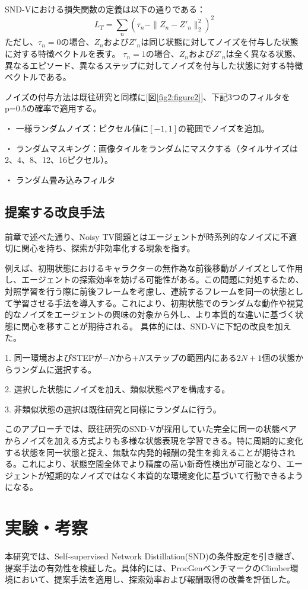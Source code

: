 SND-Vにおける損失関数の定義は以下の通りである：
\[
 L_T = \sum_{n} (\tau_n - \| Z_n - Z'_n \|_2^2)^2
\]
ただし、\(\tau_n = 0\)の場合、\(Z_n\)および\(Z'_n\)は同じ状態に対してノイズを付与した状態に対する特徴ベクトルを表す。
\(\tau_n = 1\)の場合、\(Z_n\)および\(Z'_n\)は全く異なる状態、異なるエピソード、異なるステップに対してノイズを付与した状態に対する特徴ベクトルである。

ノイズの付与方法は既往研究と同様に[図\ref{fig2:figure2}]、下記3つのフィルタをp=0.5の確率で適用する。

・ 一様ランダムノイズ：ピクセル値に\([-1, 1]\)の範囲でノイズを追加。

・ ランダムマスキング：画像タイルをランダムにマスクする（タイルサイズは2、4、8、12、16ピクセル）。

・ ランダム畳み込みフィルタ

\subsection{提案する改良手法}

前章で述べた通り、Noisy TV問題とはエージェントが時系列的なノイズに不適切に関心を持ち、探索が非効率化する現象を指す。

例えば、初期状態におけるキャラクターの無作為な前後移動がノイズとして作用し、エージェントの探索効率を妨げる可能性がある。この問題に対処するため、対照学習を行う際に前後フレームを考慮し、連続するフレームを同一の状態として学習させる手法を導入する。これにより、初期状態でのランダムな動作や視覚的なノイズをエージェントの興味の対象から外し、より本質的な違いに基づく状態に関心を移すことが期待される。
具体的には、SND-Vに下記の改良を加えた。

1. 同一環境およびSTEPが\(-N\)から\(+N\)ステップの範囲内にある\(2N+1\)個の状態からランダムに選択する。

2. 選択した状態にノイズを加え、類似状態ペアを構成する。

3. 非類似状態の選択は既往研究と同様にランダムに行う。

このアプローチでは、既往研究のSND-Vが採用していた完全に同一の状態ペアからノイズを加える方式よりも多様な状態表現を学習できる。特に周期的に変化する状態を同一状態と捉え、無駄な内発的報酬の発生を抑えることが期待される。これにより、状態空間全体でより精度の高い新奇性検出が可能となり、エージェントが短期的なノイズではなく本質的な環境変化に基づいて行動できるようになる。

\section{実験・考察}
本研究では、Self-supervised Network Distillation(SND)\cite{SND}の条件設定を引き継ぎ、提案手法の有効性を検証した。具体的には、ProcGenベンチマークのClimber環境において、提案手法を適用し、探索効率および報酬取得の改善を評価した。

